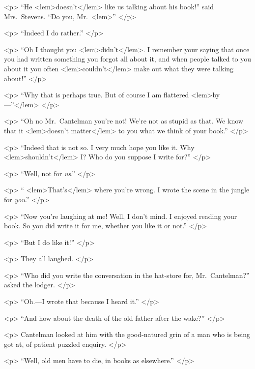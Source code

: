 {{				<p>
				“He 
<lem>doesn't</lem>
					{} 
				like us talking about his book!” said Mrs.\ Stevens. “Do you, 
				Mr.\ 
<lem>” 
 				</p> 

				<p>
				“Indeed I do rather.” 
				</p> 

				<p>
“Oh I thought you 
<lem>didn't</lem>{}. 
				I remember your saying that once you had written something 
				you forgot all about it, and when people talked to you about it you often 
<lem>couldn't</lem>{\Afootnote{could'nt}}  
				make out what they were talking about!” 
 				</p> 

				<p>
				“Why that is perhaps true. But of course I am flattered 
<lem>by---”</lem>{} 
 				</p> 

				<p>
				“Oh no Mr.\ Cantelman you're not! We're not as stupid as that. We know that it 
<lem>doesn't matter</lem>
					{} 
				to you what we think of your book.” 
 				</p> 

				<p>
				“Indeed that is not so. I very much hope you like it. Why 
<lem>shouldn't</lem>
					{} I? Who do you 
				suppose I write for?” 
 				</p> 

				<p>
				“Well, not for \emph{us}.” 
 				</p> 

				<p>
				“
<lem>That's</lem>{} where you're wrong. I wrote the scene in the jungle for \emph{you}.” 
 				</p> 

				<p>
				“Now you're laughing at me! Well, I don't mind. I enjoyed reading your book. So you 
				did write it for me, whether you like it or not.” 
 				</p> 

				<p>
				“But I do like it!” 
 				</p> 

				<p>
				They all laughed. 
 				</p> 

				<p>
				“Who did you write the conversation in the hat-store for, Mr.\ Cantelman?” asked the 
				lodger. 
 				</p> 

				<p>
				“Oh.---I wrote that because I heard it.” 
 				</p> 

				<p>
				“And how about the death of the old father after the wake?” 
 				</p> 

				<p>
				Cantelman looked at him with the good-natured grin of a man who is being got at, of 
				patient puzzled enquiry. 
 				</p> 

				<p>
				“Well, old men have to die, in books as elsewhere.” 
 				</p> 

}}
